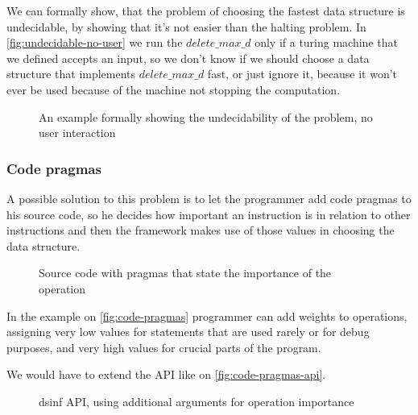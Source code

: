 \documentclass[a4paper,11pt]{article}
\begin{document}
        We can formally show, that the problem of choosing the fastest data structure is undecidable, by showing that
        it's not easier than the halting problem. In \autoref{fig:undecidable-no-user} we run the $delete\_max\_d$ only
        if a turing machine that we defined accepts an input, so we don't know if we should choose a data structure that
        implements $delete\_max\_d$ fast, or just ignore it, because it won't ever be used because of the machine not
        stopping the computation.

        \begin{figure}
			

			\caption{An example formally showing the undecidability of the problem, no user interaction}

			\label{fig:undecidable-no-user}
		\end{figure}

		\subsubsection{Code pragmas} \label{sec:pragmas}

			A possible solution to this problem is to let the programmer add code pragmas to his source
			code, so he decides how important an instruction is in relation to other instructions and then
			the framework makes use of those values in choosing the data structure.

            \begin{figure}[!h]
				

				\caption{Source code with pragmas that state the importance of the operation}

				\label{fig:code-pragmas}
			\end{figure}

            In the example on \autoref{fig:code-pragmas} programmer can add weights to operations, assigning very low values
			for statements that are used rarely or for debug purposes, and very high values for crucial
			parts of the program.

            We would have to extend the API like on \autoref{fig:code-pragmas-api}.

            \begin{figure}[!h]
				

				\caption{dsinf API, using additional arguments for operation importance}

				\label{fig:code-pragmas-api}
			\end{figure}
\end{document}
